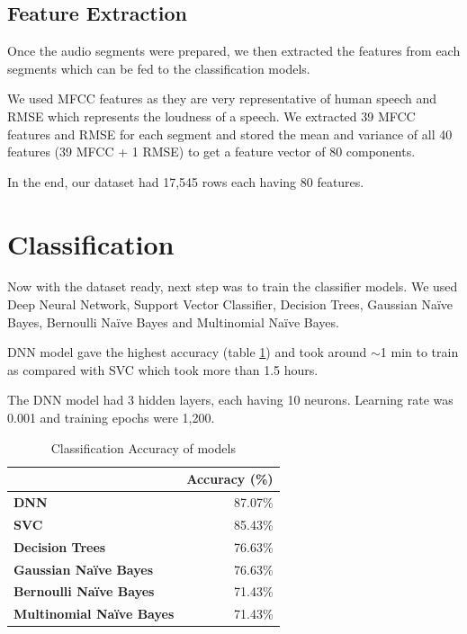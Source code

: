 \documentclass{report}
\begin{document}
\subsection{Feature Extraction}
Once the audio segments were prepared, we then extracted the features from each segments which can be fed to the classification models.

We used MFCC features as they are very representative of human speech and RMSE which represents the loudness of a speech. We extracted 39 MFCC features and RMSE for each segment and stored the mean and variance of all 40 features (39 MFCC + 1 RMSE) to get a feature vector of 80 components.

In the end, our dataset had 17,545 rows each having 80 features.

\section{Classification}
Now with the dataset ready, next step was to train the classifier models. We used Deep Neural Network, Support Vector Classifier, Decision Trees, Gaussian Na\"ive Bayes, Bernoulli Na\"ive Bayes and Multinomial Na\"ive Bayes.

DNN model gave the highest accuracy (table \ref{table:classificationAccuracy}) and took around $\sim$1 min to train as compared with SVC which took more than 1.5 hours.

The DNN model had 3 hidden layers, each having 10 neurons. Learning rate was 0.001 and training epochs were 1,200.

\begin{table}[ht]
\centering
\caption{Classification Accuracy of models}
\label{table:classificationAccuracy}
\begin{tabular}{|l|r|}
\hline
                                   & \multicolumn{1}{l|}{\textbf{Accuracy (\%)}} \\ \hline
\textbf{DNN}                       & 87.07\%                                     \\ \hline
\textbf{SVC}                       & 85.43\%                                     \\ \hline
\textbf{Decision Trees}            & 76.63\%                                     \\ \hline
\textbf{Gaussian Na\"ive Bayes}    & 76.63\%                                     \\ \hline
\textbf{Bernoulli Na\"ive Bayes}   & 71.43\%                                     \\ \hline
\textbf{Multinomial Na\"ive Bayes} & 71.43\%                                     \\ \hline
\end{tabular}
\end{table}
\end{document}

